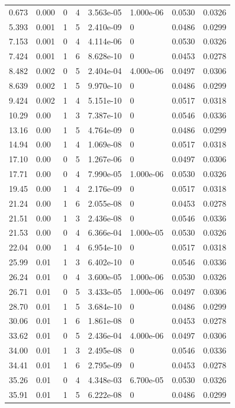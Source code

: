 \documentclass[preview]{standalone}
\begin{document}
{{\begin{tabular}{L{1.2cm}C{1.2cm} C{0.3cm}C{0.5cm} C{1.4cm}C{1.4cm} C{1.4cm}C{1.4cm}}
  0.673  &  0.000  & 0     &  4 &  3.563e-05  & 1.000e-06  & 0.0530 &  0.0326   \\ 
  5.393  &  0.001  & 1     &  5 &  2.410e-09  & 0  & 0.0486 &  0.0299   \\ 
  7.153  &  0.001  & 0     &  4 &  4.114e-06  & 0  & 0.0530 &  0.0326   \\ 
  7.424  &  0.001  & 1     &  6 &  8.628e-10  & 0  & 0.0453 &  0.0278   \\ 
  8.482  &  0.002  & 0     &  5 &  2.404e-04  & 4.000e-06  & 0.0497 &  0.0306   \\ 
  8.639  &  0.002  & 1     &  5 &  9.970e-10  & 0  & 0.0486 &  0.0299   \\ 
  9.424  &  0.002  & 1     &  4 &  5.151e-10  & 0  & 0.0517 &  0.0318   \\ 
  10.29  &  0.00  & 1     &  3 &  7.387e-10  & 0  & 0.0546 &  0.0336   \\ 
  13.16  &  0.00  & 1     &  5 &  4.764e-09  & 0  & 0.0486 &  0.0299   \\ 
  14.94  &  0.00  & 1     &  4 &  1.069e-08  & 0  & 0.0517 &  0.0318   \\ 
  17.10  &  0.00  & 0     &  5 &  1.267e-06  & 0  & 0.0497 &  0.0306   \\ 
  17.71  &  0.00  & 0     &  4 &  7.990e-05  & 1.000e-06  & 0.0530 &  0.0326   \\ 
  19.45  &  0.00  & 1     &  4 &  2.176e-09  & 0  & 0.0517 &  0.0318   \\ 
  21.24  &  0.00  & 1     &  6 &  2.055e-08  & 0  & 0.0453 &  0.0278   \\ 
  21.51  &  0.00  & 1     &  3 &  2.436e-08  & 0  & 0.0546 &  0.0336   \\ 
  21.53  &  0.00  & 0     &  4 &  6.366e-04  & 1.000e-05  & 0.0530 &  0.0326   \\ 
  22.04  &  0.00  & 1     &  4 &  6.954e-10  & 0  & 0.0517 &  0.0318   \\ 
  25.99  &  0.01  & 1     &  3 &  6.402e-10  & 0  & 0.0546 &  0.0336   \\ 
  26.24  &  0.01  & 0     &  4 &  3.600e-05  & 1.000e-06  & 0.0530 &  0.0326   \\ 
  26.71  &  0.01  & 0     &  5 &  3.433e-05  & 1.000e-06  & 0.0497 &  0.0306   \\ 
  28.70  &  0.01  & 1     &  5 &  3.684e-10  & 0  & 0.0486 &  0.0299   \\ 
  30.06  &  0.01  & 1     &  6 &  1.861e-08  & 0  & 0.0453 &  0.0278   \\ 
  33.62  &  0.01  & 0     &  5 &  2.436e-04  & 4.000e-06  & 0.0497 &  0.0306   \\ 
  34.00  &  0.01  & 1     &  3 &  2.495e-08  & 0  & 0.0546 &  0.0336   \\ 
  34.41  &  0.01  & 1     &  6 &  2.795e-09  & 0  & 0.0453 &  0.0278   \\ 
  35.26  &  0.01  & 0     &  4 &  4.348e-03  & 6.700e-05  & 0.0530 &  0.0326   \\ 
  35.91  &  0.01  & 1     &  5 &  6.222e-08  & 0  & 0.0486 &  0.0299   \\ 
\hline 
\end{tabular} 

}}
\end{document}
